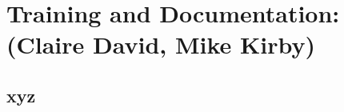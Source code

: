 \chapter{Training and Documentation: (Claire David, Mike Kirby)}
\label{ch:train}

\section{xyz}
\label{sec:train:xyz}  %

